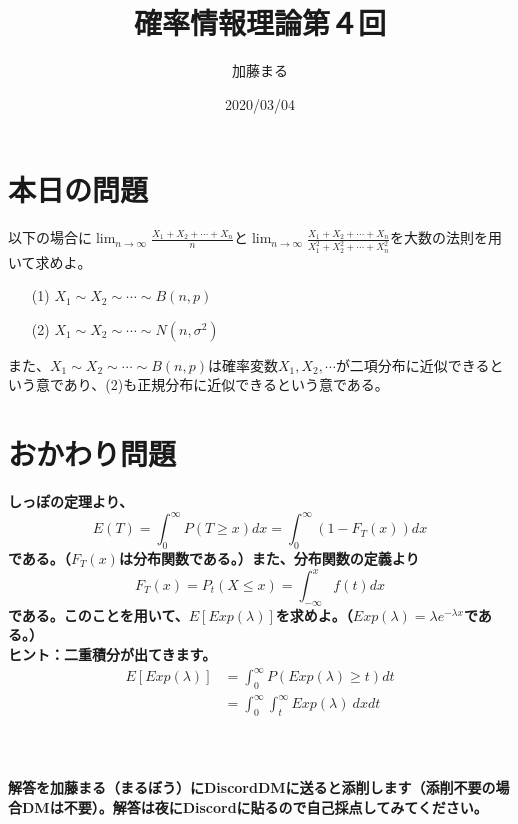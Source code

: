 \documentclass[a4j,uplatex]{jsarticle}
\title{確率情報理論第４回}
\author{加藤まる}
\date{2020/03/04}
\begin{document}
\maketitle

\section*{本日の問題}
以下の場合に$\displaystyle \lim_{n \to \infty} \frac{X_1 + X_2 + \cdots +X_n}{n}$と$\displaystyle \lim_{n \to \infty} \frac{X_1 + X_2 + \cdots +X_n}{X_1^2 + X_2^2 + \cdots +X_n^2}$を大数の法則を用いて求めよ。
\begin{itemize}
  \item[(1)] $X_1\sim X_2\sim \cdots \sim B(n,p)$
  \item[(2)] $X_1\sim X_2\sim \cdots \sim N(n,\sigma ^2)$
\end{itemize}
また、$X_1\sim X_2\sim \cdots \sim B(n,p)$は確率変数$X_1, X_2,\cdots$が二項分布に近似できるという意であり、(2)も正規分布に近似できるという意である。


\section*{おかわり問題}
\bf しっぽの定理\rm より、
\begin{equation}
  E(T)=\int_{0}^{\infty} P(T\ge x)dx = \int_{0}^{\infty} (1-F_T (x))dx
\end{equation}
である。（$F_T (x)$は分布関数である。）また、分布関数の定義より
\begin{equation}
  F_T(x) = P_t(X\le x) = \int_{-\infty}^{x} f(t)dx
\end{equation}
である。このことを用いて、$E[Exp(\lambda)]$を求めよ。（$Exp(\lambda)=\lambda e^{-\lambda x}$である。）
\\
ヒント：二重積分が出てきます。
\begin{equation}
  \begin{split}
    E[Exp(\lambda)] &= \int_{0}^{\infty} P(Exp(\lambda)\ge t)dt \\
    &=\int_{0}^{\infty} \int_{t}^{\infty} Exp(\lambda)~ dx dt
  \end{split}
\end{equation}
\\
\\
\\
解答を加藤まる（まるぼう）にDiscordDMに送ると添削します（添削不要の場合DMは不要）。解答は夜にDiscordに貼るので自己採点してみてください。
\end{document}
